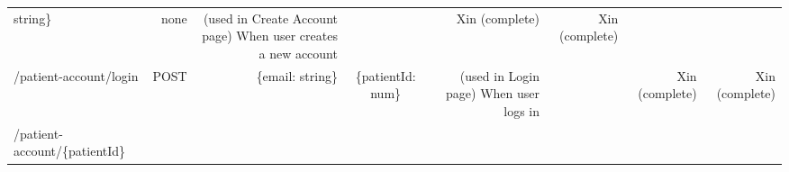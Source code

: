 \documentclass[]{book}
\begin{document}
\begin{longtable}[]{@{}lrrcrrrr@{}}
\begin{minipage}[t]{0.13\columnwidth}
string\}\strut
\end{minipage} & \begin{minipage}[t]{0.14\columnwidth}\centering\strut
none\strut
\end{minipage} & \begin{minipage}[t]{0.06\columnwidth}\raggedleft\strut
(used in Create Account page) When user creates a new account\strut
\end{minipage} & \begin{minipage}[t]{0.06\columnwidth}\raggedleft\strut
\strut
\end{minipage} & \begin{minipage}[t]{0.06\columnwidth}\raggedleft\strut
Xin (complete)\strut
\end{minipage} & \begin{minipage}[t]{0.06\columnwidth}\raggedleft\strut
Xin (complete)\strut
\end{minipage}\tabularnewline
\begin{minipage}[t]{0.12\columnwidth}\raggedright\strut
/patient-account/login\strut
\end{minipage} & \begin{minipage}[t]{0.13\columnwidth}\raggedleft\strut
POST\strut
\end{minipage} & \begin{minipage}[t]{0.13\columnwidth}\raggedleft\strut
\{email: string\}\strut
\end{minipage} & \begin{minipage}[t]{0.14\columnwidth}\centering\strut
\{patientId: num\}\strut
\end{minipage} & \begin{minipage}[t]{0.06\columnwidth}\raggedleft\strut
(used in Login page) When user logs in\strut
\end{minipage} & \begin{minipage}[t]{0.06\columnwidth}\raggedleft\strut
\strut
\end{minipage} & \begin{minipage}[t]{0.06\columnwidth}\raggedleft\strut
Xin (complete)\strut
\end{minipage} & \begin{minipage}[t]{0.06\columnwidth}\raggedleft\strut
Xin (complete)\strut
\end{minipage}\tabularnewline
\begin{minipage}[t]{0.12\columnwidth}\raggedright\strut
/patient-account/\{patientId\}\strut
\end{minipage} & \begin{minipage}[t]{0.13\columnwidth}\raggedleft\strut

\end{minipage}
\end{longtable}
\end{document}

